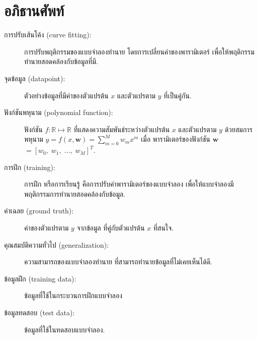 \section{อภิธานศัพท์}

\begin{description}
	
	\item[การปรับเส้นโค้ง (curve fitting):] 
การปรับพฤติกรรมของแบบจำลองทำนาย 
โดยการเปลี่ยนค่าของพารามิเตอร์ เพื่อให้พฤติกรรมทำนายสอดคล้องกับข้อมูลที่มี.

\item[จุดข้อมูล (datapoint):] 
ตัวอย่างข้อมูลที่มีค่าของตัวแปรต้น $x$ และตัวแปรตาม $y$ ที่เป็นคู่กัน.

\item[ฟังก์ชันพหุนาม (polynomial function):] 
ฟังก์ชัน $f: \mathbb{R} \mapsto \mathbb{R}$
ที่แสดงความสัมพันธ์ระหว่างตัวแปรต้น $x$ และตัวแปรตาม $y$ ด้วยสมการพหุนาม
$y = f(x, \bm{w}) = \sum_{m=0}^M w_m x^m$
เมื่อ พารามิเตอร์ของฟังก์ชัน $\bm{w}$ $= [w_0, \; w_1, \; \ldots, \; w_M]^T$.

\item[การฝึก (training):] 
การฝึก หรือการเรียนรู้ คือการปรับค่าพารามิเตอร์ของแบบจำลอง เพื่อให้แบบจำลองมีพฤติกรรมการทำนายสอดคล้องกับข้อมูล.

\item[ค่าเฉลย (ground truth):] 
ค่าของตัวแปรตาม $y$ จากข้อมูล ที่คู่กับตัวแปรต้น $x$ ที่สนใจ.

\item[คุณสมบัติความทั่วไป (generalization):] 
ความสามารถของแบบจำลองทำนาย ที่สามารถทำนายข้อมูลที่ไม่เคยเห็นได้ดี.

\item[ข้อมูลฝึก (training data):] 
ข้อมูลที่ใช้ในกระบวนการฝึกแบบจำลอง

\item[ข้อมูลทดสอบ (test data):] 
ข้อมูลที่ใช้ในทดสอบแบบจำลอง.


\end{description}
